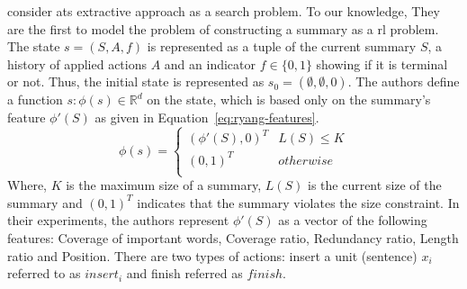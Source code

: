 \citet{12-ryang-abekawa} consider \ac{ats} extractive approach as a search problem. 
To our knowledge, They are the first to model the problem of constructing a summary as a \ac{rl} problem.
The state $ s = (S, A, f) $ is represented as a tuple of the current summary $ S $, a history of applied actions $ A $ and an indicator $ f \in \{0, 1 \} $ showing if it is terminal or not.
Thus, the initial state is represented as $ s_0 = (\emptyset,\emptyset, 0) $.
The authors define a function $ s: \phi(s) \in \mathbb{R}^d $ on the state, which is based only on the summary's feature $ \phi'(S) $ as given in Equation~\ref{eq:ryang-features}.
\begin{equation}
\label{eq:ryang-features}
\phi(s) = \left\lbrace 
\begin{array}{ll}
(\phi'(S), 0)^T & L(S) \le K \\
(0, 1)^T & otherwise \\
\end{array}
\right. 
\end{equation}
Where, $ K $ is the maximum size of a summary, $ L(S) $ is the current size of the summary and $ (0, 1)^T $ indicates that the summary violates the size constraint. 
In their experiments, the authors represent $ \phi'(S) $ as a vector of the following features: Coverage of important words, Coverage ratio, Redundancy ratio, Length ratio and Position. 
There are two types of actions: insert a unit (sentence) $ x_i $ referred to as $ insert_i $ and finish referred as $ finish $. 
%
%
%
